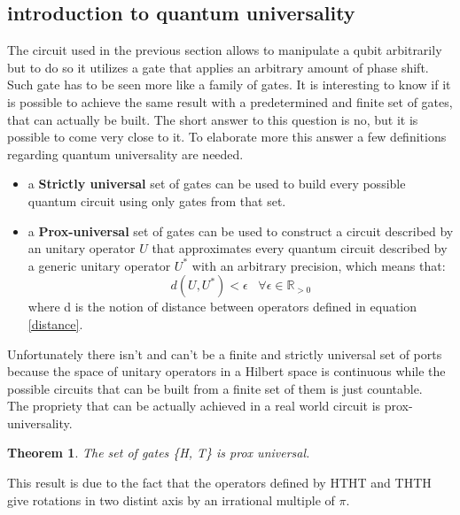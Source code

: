 \documentclass{article}
\newtheorem{theorem}{Theorem}
\begin{document}
\subsection{introduction to quantum universality}

The circuit used in the previous section allows to manipulate a qubit arbitrarily
but to do so it utilizes a gate that applies an arbitrary amount of phase shift.
Such gate has to be seen more like a family of gates.
It is interesting to know if it is possible to achieve the same result with a
predetermined and finite set of gates, that can actually be built.
The short answer to this question is no, but it is possible to come very close to it.
To elaborate more this answer a few definitions regarding quantum universality are needed.
\begin{itemize}

	\item a \textbf{Strictly universal} set of gates can be used to build every
	      possible quantum circuit using only gates from that set.


	\item a \textbf{Prox-universal} set of gates can be used to construct a circuit
	      described by an unitary operator $U$ that approximates every quantum
	      circuit described by a generic unitary operator $U^*$ with an arbitrary
	      precision, which means that:
	      \begin{equation}
		      d(U,U^*) < \epsilon \hspace{10pt} \forall \epsilon \in \mathbb{R}_{>0}
	      \end{equation}
	      where d is the notion of distance between operators defined in
	      equation \ref{distance}.


\end{itemize}
Unfortunately there isn't and can't be a finite and strictly universal
set of ports because the space of unitary operators in a
Hilbert space is continuous while the possible circuits that can be built
from a finite set of them is just countable.\\
The propriety that can be actually achieved in a real world circuit is
prox-universality.\\

\begin{theorem}
	The set of gates \{H, T\} is prox universal.
	\label{univone}
\end{theorem}
This result is due to the fact that the operators defined by HTHT and THTH
give rotations in two distint axis by an irrational multiple of $\pi$.
\end{document}
